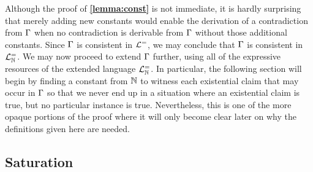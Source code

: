 Although the proof of \textbf{\ref{lemma:const}} is not immediate, it is hardly surprising that merely adding new constants would enable the derivation of a contradiction from $\Gamma$ when no contradiction is derivable from $\Gamma$ without those additional constants.
Since $\Gamma$ is consistent in $\mathcal{L}^{=}$, we may conclude that $\Gamma$ is consistent in $\mathcal{L}^{=}_{\mathbb{N}}$.
We may now proceed to extend $\Gamma$ further, using all of the expressive resources of the extended language $\mathcal{L}^{=}_{\mathbb{N}}$. 
In particular, the following section will begin by finding a constant from $\mathbb{N}$ to witness each existential claim that may occur in $\Gamma$ so that we never end up in a situation where an existential claim is true, but no particular instance is true. 
Nevertheless, this is one of the more opaque portions of the proof where it will only become clear later on why the definitions given here are needed.





\subsection{Saturation}%
  \label{sub:Saturation}

